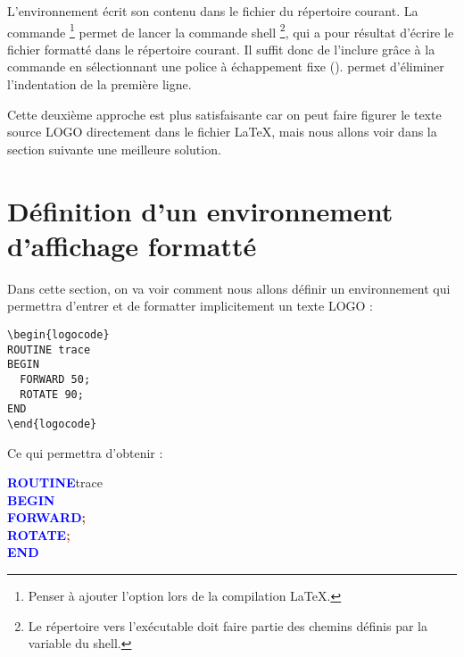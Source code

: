 L'environnement  écrit son contenu dans le fichier  du répertoire courant. La commande \footnote{Penser à ajouter l'option  lors de la compilation \LaTeX.} permet de lancer la commande shell \footnote{Le répertoire vers l'exécutable  doit faire partie des chemins définis par la variable  du shell.}, qui a pour résultat d'écrire le fichier formatté  dans le répertoire courant. Il suffit donc de l'inclure grâce à la commande  en sélectionnant une police à échappement fixe ().  permet d'éliminer l'indentation de la première ligne.

Cette deuxième approche est plus satisfaisante car on peut faire figurer le texte source LOGO directement dans le fichier \LaTeX, mais nous allons voir dans la section suivante une meilleure solution.











\section{Définition d'un environnement d'affichage formatté}

Dans cette section, on va voir comment nous allons définir un environnement  qui permettra d'entrer et de formatter implicitement un texte LOGO :

\begin{verbatim}
\begin{logocode}
ROUTINE trace
BEGIN
  FORWARD 50;
  ROTATE 90;
END
\end{logocode}
\end{verbatim}

Ce qui permettra d'obtenir :

{\noindent\ttfamily
\textcolor{blue}{\bf ROUTINE}\hspace*{.6em}t{}r{}a{}c{}e{} \\
\textcolor{blue}{\bf BEGIN} \\
\hspace*{1.2em}\textcolor{blue}{\bf FORWARD}\hspace*{.6em}\textcolor{brown}{\bf ;} \\
\hspace*{1.2em}\textcolor{blue}{\bf ROTATE}\hspace*{.6em}\textcolor{brown}{\bf ;} \\
\textcolor{blue}{\bf END}
}


